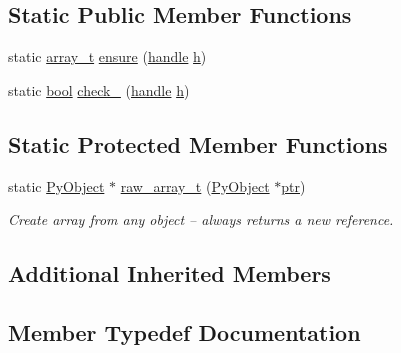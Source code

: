 \subsection*{Static Public Member Functions}
\begin{DoxyCompactItemize}
\item 
static \mbox{\hyperlink{classarray__t}{array\+\_\+t}} \mbox{\hyperlink{classarray__t_a9e4404f6ad193d54f7354655823d3841}{ensure}} (\mbox{\hyperlink{classhandle}{handle}} \mbox{\hyperlink{_s_d_l__opengl__glext_8h_afa0fb1b5e976920c0abeff2dca3ed774}{h}})
\item 
static \mbox{\hyperlink{asdl_8h_af6a258d8f3ee5206d682d799316314b1}{bool}} \mbox{\hyperlink{classarray__t_a9cfdc02b42e11147b419b4e2a98d2591}{check\+\_\+}} (\mbox{\hyperlink{classhandle}{handle}} \mbox{\hyperlink{_s_d_l__opengl__glext_8h_afa0fb1b5e976920c0abeff2dca3ed774}{h}})
\end{DoxyCompactItemize}
\subsection*{Static Protected Member Functions}
\begin{DoxyCompactItemize}
\item 
static \mbox{\hyperlink{_python27_2object_8h_aadc84ac7aed2cfa6f20c25f62bf3dac7}{Py\+Object}} $\ast$ \mbox{\hyperlink{classarray__t_a49bc4cbb7ac30eb5ddbfa8df992d897d}{raw\+\_\+array\+\_\+t}} (\mbox{\hyperlink{_python27_2object_8h_aadc84ac7aed2cfa6f20c25f62bf3dac7}{Py\+Object}} $\ast$\mbox{\hyperlink{classhandle_afcd412ba4cbffd7d1e3c9338746b2682}{ptr}})
\begin{DoxyCompactList}\small\item\em Create array from any object -- always returns a new reference. \end{DoxyCompactList}\end{DoxyCompactItemize}
\subsection*{Additional Inherited Members}


\subsection{Member Typedef Documentation}
\mbox{\label{classarray__t_a8d5309087f29c7ad8a9187ec9756a6c2}} 
